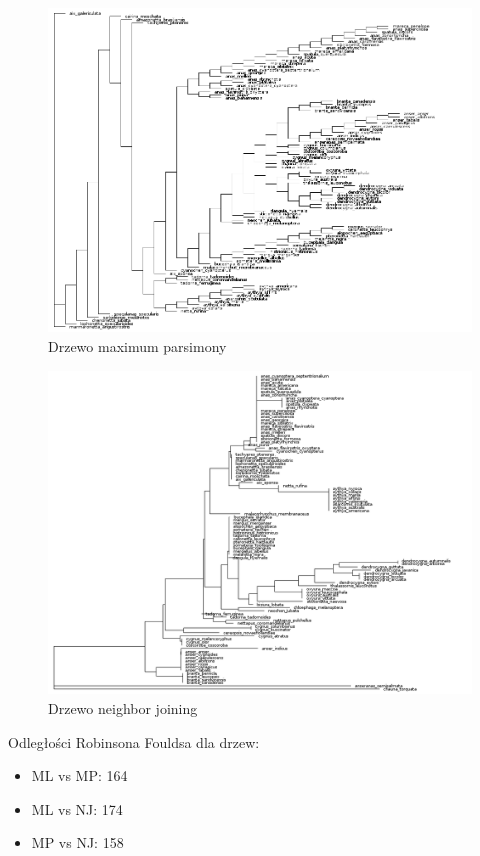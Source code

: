 \documentclass[12pt]{article}
\begin{document}
\begin{figure}[H]
\begin{center}
\includegraphics[width=\textwidth]{mp}
\caption{Drzewo maximum parsimony}
\end{center}
\end{figure}

\begin{figure}[H]
\begin{center}
\includegraphics[width=\textwidth]{nj}
\caption{Drzewo neighbor joining}
\end{center}
\end{figure}

Odległości Robinsona Fouldsa dla drzew:
\begin{itemize}
\item ML vs MP: 164
\item ML vs NJ: 174
\item MP vs NJ: 158
\end{itemize}
\end{document}
